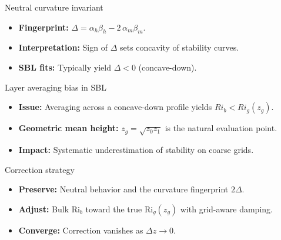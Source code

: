 \documentclass[aspectratio=169]{beamer}
\begin{document}
\begin{frame}{Neutral curvature invariant}
  \begin{itemize}
    \item \textbf{Fingerprint:} \(\Delta = \alpha_h \beta_h - 2\,\alpha_m \beta_m\).
    \item \textbf{Interpretation:} Sign of \(\Delta\) sets concavity of stability curves.
    \item \textbf{SBL fits:} Typically yield \(\Delta < 0\) (concave-down).
  \end{itemize}
\end{frame}

\begin{frame}{Layer averaging bias in SBL}
  \begin{center}
    
  \end{center}
  \begin{itemize}
    \item \textbf{Issue:} Averaging across a concave-down profile yields \(Ri_b < Ri_g(z_g)\).
    \item \textbf{Geometric mean height:} \(z_g = \sqrt{z_0 z_1}\) is the natural evaluation point.
    \item \textbf{Impact:} Systematic underestimation of stability on coarse grids.
  \end{itemize}
\end{frame}

\begin{frame}{Correction strategy}
  \begin{itemize}
    \item \textbf{Preserve:} Neutral behavior and the curvature fingerprint \(2\Delta\).
    \item \textbf{Adjust:} Bulk Ri\(_b\) toward the true Ri\(_g(z_g)\) with grid-aware damping.
    \item \textbf{Converge:} Correction vanishes as \(\Delta z \to 0\).
  \end{itemize}
\end{frame}
\end{document}
